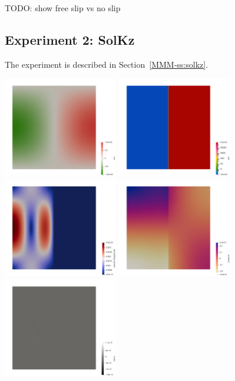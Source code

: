 TODO: show free slip vs no slip


\newpage
\subsection*{Experiment 2: SolKz}

The experiment is described in Section~\ref{MMM-ss:solkz}.

\begin{center}
\includegraphics[width=5cm]{python_codes/fieldstone_158/results/exp3/rho}
\includegraphics[width=5cm]{python_codes/fieldstone_158/results/exp3/eta}\\
\includegraphics[width=5cm]{python_codes/fieldstone_158/results/exp3/vel}
\includegraphics[width=5cm]{python_codes/fieldstone_158/results/exp3/press}
\includegraphics[width=5cm]{python_codes/fieldstone_158/results/exp3/divv}
\end{center} 

